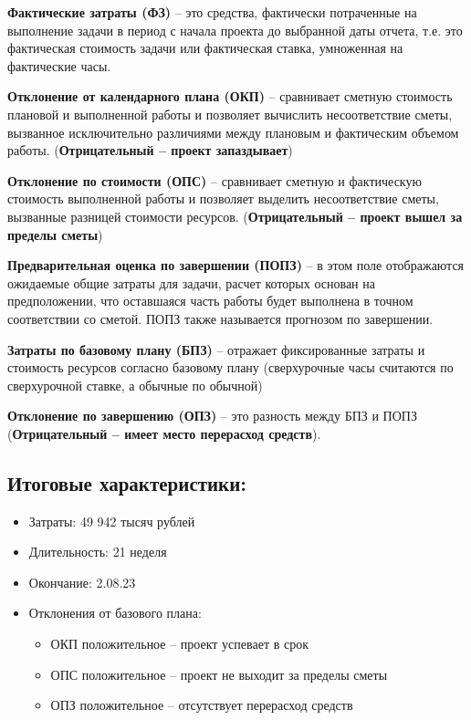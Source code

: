 \textbf{Фактические затраты (ФЗ)} -- это средства, фактически потраченные на выполнение задачи в период с начала проекта до выбранной даты отчета, т.е. это фактическая стоимость задачи или фактическая ставка, умноженная на фактические часы.

\textbf{Отклонение от календарного плана (ОКП)} -- сравнивает сметную стоимость плановой и выполненной работы и позволяет вычислить несоответствие сметы, вызванное исключительно различиями между плановым и фактическим объемом работы. (\textbf{Отрицательный -- проект запаздывает})

\textbf{Отклонение по стоимости (ОПС)} -- сравнивает сметную и фактическую стоимость выполненной работы и позволяет выделить несоответствие сметы, вызванные разницей стоимости ресурсов. (\textbf{Отрицательный -- проект вышел за пределы сметы})

\textbf{Предварительная оценка по завершении (ПОПЗ)} -- в этом поле отображаются ожидаемые общие затраты для задачи, расчет которых основан на предположении, что оставшаяся часть работы будет выполнена в точном соответствии со сметой. ПОПЗ также называется прогнозом по завершении.

\textbf{Затраты по базовому плану (БПЗ)} -- отражает фиксированные затраты и стоимость ресурсов согласно базовому плану (сверхурочные часы считаются по сверхурочной ставке, а обычные по обычной) 

\textbf{Отклонение по завершению (ОПЗ)} -- это разность между БПЗ и ПОПЗ (\textbf{Отрицательный -- имеет место перерасход средств}).

\subsection*{Итоговые характеристики:}

\begin{itemize}
	\item Затраты: 49 942 тысяч рублей
	\item Длительность: 21 неделя
	\item Окончание: 2.08.23
	\item Отклонения от базового плана:
	\begin{itemize}
		\item ОКП положительное -- проект успевает в срок
		\item ОПС положительное -- проект не выходит за пределы сметы
		\item ОПЗ положительное -- отсутствует перерасход средств
	\end{itemize}
\end{itemize}

